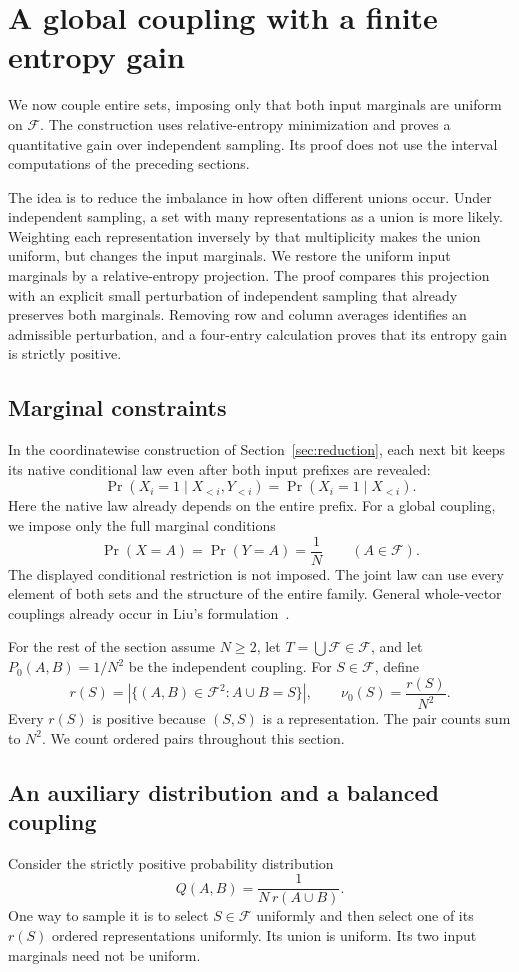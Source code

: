 \documentclass[11pt]{article}
\theoremstyle{remark}
\newcommand{\F}{\mathcal F}
\begin{document}
\section{A global coupling with a finite entropy gain}\label{sec:global}

We now couple entire sets, imposing only that both input marginals
are uniform on \(\F\). The construction uses relative-entropy
minimization and proves a quantitative gain over independent sampling.
Its proof does not use the interval computations of the preceding
sections.

The idea is to reduce the imbalance in how often different unions
occur. Under independent sampling, a set with many representations
as a union is more likely. Weighting each representation inversely
by that multiplicity makes the union uniform, but changes the input
marginals. We restore the uniform input marginals by a relative-entropy
projection. The proof compares this projection with an explicit small
perturbation of independent sampling that already preserves both
marginals. Removing row and column averages identifies an admissible
perturbation, and a four-entry calculation proves that its entropy gain
is strictly positive.


\subsection{Marginal constraints}
In the coordinatewise construction of Section~\ref{sec:reduction}, each next bit keeps its
native conditional law even after both input prefixes are revealed:
\[
\Pr(X_i=1\mid X_{<i},Y_{<i})=\Pr(X_i=1\mid X_{<i}).
\]
Here the native law already depends on the entire prefix.
For a global coupling, we impose only the full marginal conditions
\[
\Pr(X=A)=\Pr(Y=A)=\frac1N\qquad(A\in\F).
\]
The displayed conditional restriction is not imposed.
The joint law can use every element of both sets and the structure of
the entire family. General whole-vector couplings already occur in
Liu's formulation~\cite{liu}.

For the rest of the section assume \(N\ge2\), let \(T=\bigcup\F\in\F\),
and let \(P_0(A,B)=1/N^2\) be the independent coupling.
For \(S\in\F\), define
\[
r(S)=|\{(A,B)\in\F^2:A\cup B=S\}|,\qquad \nu_0(S)=\frac{r(S)}{N^2}.
\]
Every \(r(S)\) is positive because \((S,S)\) is a representation.
The pair counts sum to \(N^2\).
We count ordered pairs throughout this section.

\subsection{An auxiliary distribution and a balanced coupling}
Consider the strictly positive probability distribution
\[
Q(A,B)=\frac{1}{N\,r(A\cup B)}.
\]
One way to sample it is to select \(S\in\F\) uniformly and then select
one of its \(r(S)\) ordered representations uniformly.
Its union is uniform. Its two input marginals need not be uniform.
\end{document}
